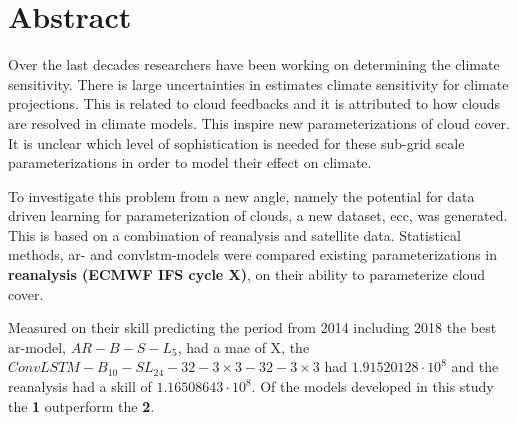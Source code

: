 \chapter*{Abstract}

Over the last decades researchers have been working on determining the climate sensitivity. 
There is large uncertainties in estimates climate sensitivity for climate projections. This is related to cloud feedbacks and it is attributed to how clouds are resolved in climate models. 
This inspire new parameterizations of cloud cover. It is unclear which level of sophistication is needed for these sub-grid scale parameterizations in order to model their effect on climate.

To investigate this problem from a new angle, namely the potential for data driven learning for parameterization of clouds, a new dataset, \acrfull{ecc}, was generated. This is based on a combination of reanalysis and satellite data. %
Statistical methods, \acrfull{ar}- and \acrfull{convlstm}-models were compared existing parameterizations in \textbf{reanalysis (ECMWF IFS cycle X)}, on their ability to parameterize cloud cover. 

Measured on their skill predicting the period
from 2014 including 2018 the best \acrshort{ar}-model, $AR-B-S-L_5$, had a \acrshort{mae} of X,  the $ConvLSTM-B_{10}-SL_{24}-32-3\times3-32-3 \times3$ had $1.91520128 \cdot 10^8$ and the reanalysis had a skill of $1.16508643\cdot10^8$. Of the models developed in this study the \textbf{1} outperform the \textbf{2}.

